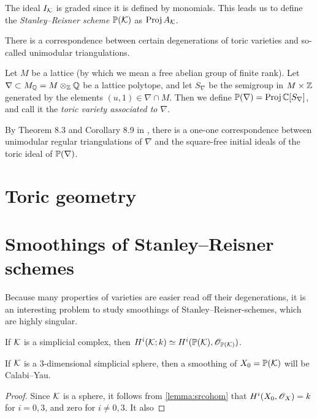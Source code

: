 The ideal $I_\K$ is graded since it is defined by monomials. This leads us to define the \emph{Stanley--Reisner scheme} $\P(\K)$ as $\Proj A_\K$. 

There is a correspondence between certain degenerations of toric varieties and so-called unimodular triangulations. 

Let $M$ be a lattice (by which we mean a free abelian group of finite rank). Let $\nabla \subset M_\Q = M \otimes_\Z \Q$ be a lattice polytope, and let $S_\nabla$ be the semigroup in $M \times \Z$ generated by the elements $(u,1) \in \nabla \cap M$. Then we define $\P(\nabla)=\Proj \C[S_\nabla]$, and call it the \emph{toric variety associated to $\nabla$}. 

By Theorem 8.3 and Corollary 8.9 in \cite{sturmfels}, there is a one-one correspondence between unimodular regular triangulations of $\nabla$ and the square-free initial ideals of the toric ideal of $\P(\nabla)$. 

\section{Toric geometry}
\label{sec:toricgeometry}


\section{Smoothings of Stanley--Reisner schemes}

Because many properties of varieties are easier read off their degenerations, it is an interesting problem to study smoothings of Stanley--Reisner-schemes, which are highly singular.

\begin{lemma}
\label{lemma:srcohom}
If $\K$ is a simplicial complex, then $H^i(\K;k) \simeq H^i(\P(\K),\OO_{\P(\K)})$.
\end{lemma}

\begin{lemma}
If $\K$ is a 3-dimensional simplicial sphere, then a smoothing of $X_0=\P(\K)$ will be Calabi--Yau.
\end{lemma}
\begin{proof}
Since $\K$ is a sphere, it follows from \ref{lemma:srcohom} that $H^i(X_0,\OO_X)=k$ for $i=0,3$, and zero for $i \neq 0,3$. It also 
\end{proof}